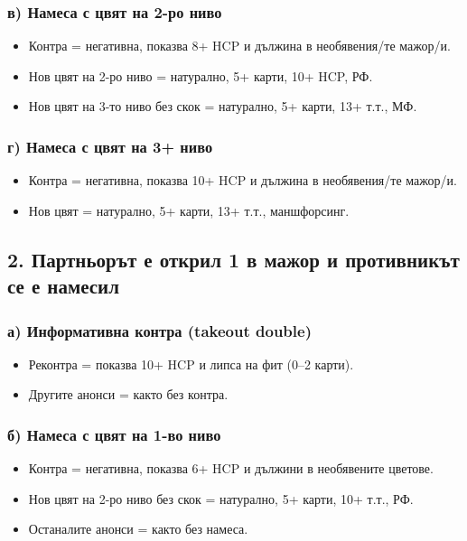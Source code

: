 \documentclass[10pt,a5paper]{extarticle}
\begin{document}
\subsubsection*{в) Намеса с цвят на 2-ро ниво}
\begin{itemize}
    \item Контра = негативна, показва 8+ HCP и дължина в необявения/те мажор/и.
    \item Нов цвят на 2-ро ниво = натурално, 5+ карти, 10+ HCP, РФ.
    \item Нов цвят на 3-то ниво без скок = натурално, 5+ карти, 13+ т.т., МФ.
\end{itemize}

\subsubsection*{г) Намеса с цвят на 3+ ниво}
\begin{itemize}
    \item Контра = негативна, показва 10+ HCP и дължина в необявения/те мажор/и.
    \item Нов цвят = натурално, 5+ карти, 13+ т.т., маншфорсинг.
\end{itemize}

\bigskip
{}


\subsection*{2. Партньорът е открил 1 в мажор и противникът се е намесил}

\subsubsection*{а) Информативна контра (takeout double)}
\begin{itemize}
    \item[] Реконтра = показва 10+ HCP и липса на фит (0--2 карти).
    \item[] Другите анонси = както без контра.
\end{itemize}

\subsubsection*{б) Намеса с цвят на 1-во ниво}
\begin{itemize}
    \item[] Контра = негативна, показва 6+ HCP и дължини в необявените цветове.
    \item[] Нов цвят на 2-ро ниво без скок = натурално, 5+ карти, 10+ т.т., РФ.
    \item[] Останалите анонси = както без намеса.
\end{itemize}
\end{document}
